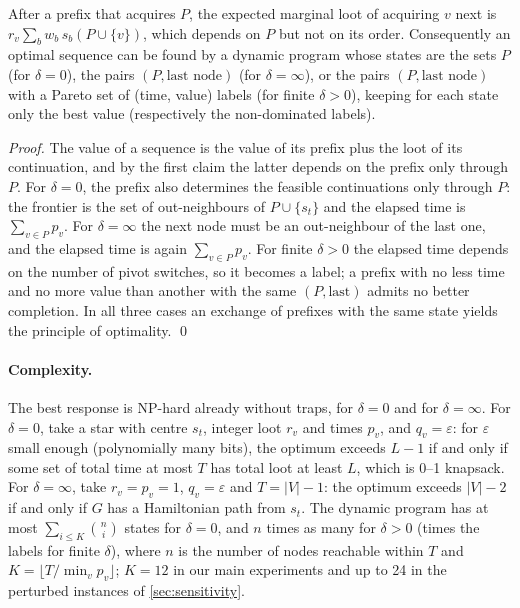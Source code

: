 \documentclass[runningheads]{llncs}
\begin{document}
\begin{proposition}\label{prop:sets}
After a prefix that acquires $P$, the expected marginal loot of acquiring $v$ next is $r_v\sum_b w_b\,s_b(P\cup\{v\})$, which depends on $P$ but not on its order. Consequently an optimal sequence can be found by a dynamic program whose states are the sets $P$ (for $\delta=0$), the pairs $(P,\text{last node})$ (for $\delta=\infty$), or the pairs $(P,\text{last node})$ with a Pareto set of (time, value) labels (for finite $\delta>0$), keeping for each state only the best value (respectively the non-dominated labels).
\end{proposition}
\begin{proof}
The value of a sequence is the value of its prefix plus the loot of its continuation, and by the first claim the latter depends on the prefix only through $P$. For $\delta=0$, the prefix also determines the feasible continuations only through $P$: the frontier is the set of out-neighbours of $P\cup\{s_t\}$ and the elapsed time is $\sum_{v\in P}p_v$. For $\delta=\infty$ the next node must be an out-neighbour of the last one, and the elapsed time is again $\sum_{v\in P}p_v$. For finite $\delta>0$ the elapsed time depends on the number of pivot switches, so it becomes a label; a prefix with no less time and no more value than another with the same $(P,\text{last})$ admits no better completion. In all three cases an exchange of prefixes with the same state yields the principle of optimality. \qed
\end{proof}

\paragraph{Complexity.}
The best response is NP-hard already without traps, for $\delta=0$ and for $\delta=\infty$. For $\delta=0$, take a star with centre $s_t$, integer loot $r_v$ and times $p_v$, and $q_v=\varepsilon$: for $\varepsilon$ small enough (polynomially many bits), the optimum exceeds $L-1$ if and only if some set of total time at most $T$ has total loot at least $L$, which is 0--1 knapsack. For $\delta=\infty$, take $r_v=p_v=1$, $q_v=\varepsilon$ and $T=|V|-1$: the optimum exceeds $|V|-2$ if and only if $G$ has a Hamiltonian path from $s_t$. The dynamic program has at most $\sum_{i\le K}\binom{n}{i}$ states for $\delta=0$, and $n$ times as many for $\delta>0$ (times the labels for finite $\delta$), where $n$ is the number of nodes reachable within $T$ and $K=\lfloor T/\min_v p_v\rfloor$; $K=12$ in our main experiments and up to 24 in the perturbed instances of \cref{sec:sensitivity}.
\end{document}
